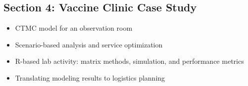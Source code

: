 \documentclass[
]{article}
\providecommand{\tightlist}{%
  \setlength{\itemsep}{0pt}\setlength{\parskip}{0pt}}\usepackage{longtable,booktabs,array}
\begin{document}
\subsection{Section 4: Vaccine Clinic Case
Study}\label{section-4-vaccine-clinic-case-study}

\begin{itemize}
\tightlist
\item
  CTMC model for an observation room
\item
  Scenario-based analysis and service optimization
\item
  R-based lab activity: matrix methods, simulation, and performance
  metrics
\item
  Translating modeling results to logistics planning
\end{itemize}
\end{document}
